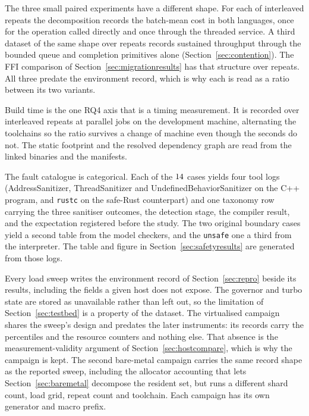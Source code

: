 \documentclass[english,oneside,a4paper,censored,csm,software-track-2020]{HYthesisML}
\begin{document}
\begin{appendices}
The three small paired experiments have a different shape. For each of \BudgetRepeats{}
interleaved repeats the decomposition records the batch-mean cost in both languages, once for
the operation called directly and once through the threaded service. A third dataset of the same
shape over \ContentionRepeats{} repeats records sustained throughput through the bounded queue and
completion primitives alone (Section~\ref{sec:contention}). The FFI comparison of
Section~\ref{sec:migrationresults} has that structure over \FfiOpRepeats{} repeats. All three
predate the environment record, which is why each is read as a ratio between its two variants.

Build time is the one RQ4 axis that is a timing measurement. It is recorded over
\AdoptRepeats{} interleaved repeats at \AdoptJobs{} parallel jobs on the development machine,
alternating the toolchains so the ratio survives a change of machine even though the seconds do
not. The static footprint and the resolved dependency graph are read from the linked binaries
and the manifests.

The fault catalogue is categorical. Each of the $14$ cases yields four tool logs
(AddressSanitizer, ThreadSanitizer and UndefinedBehaviorSanitizer on the C++ program, and
\texttt{rustc} on the safe-Rust counterpart) and one taxonomy row carrying the three sanitiser
outcomes, the detection stage, the compiler result, and the expectation registered before the
study. The two original boundary cases yield a second table from the model checkers, and the
\texttt{unsafe} one a third from the interpreter. The table and figure in
Section~\ref{sec:safetyresults} are generated from those logs.

Every load sweep writes the environment record of Section~\ref{sec:repro} beside its results,
including the fields a given host does not expose. The governor and turbo state are stored as
unavailable rather than left out, so the limitation of Section~\ref{sec:testbed} is a property
of the dataset. The virtualised campaign shares the sweep's design and predates the later
instruments: its records carry the percentiles and the resource counters and nothing else. That
absence is the measurement-validity argument of Section~\ref{sec:hostcompare}, which is why the
campaign is kept. The second bare-metal campaign carries the same record shape as the reported
sweep, including the allocator accounting that lets Section~\ref{sec:baremetal} decompose the
resident set, but runs a different shard count, load grid, repeat count and toolchain. Each
campaign has its own generator and macro prefix.


\end{appendices}
\end{document}
